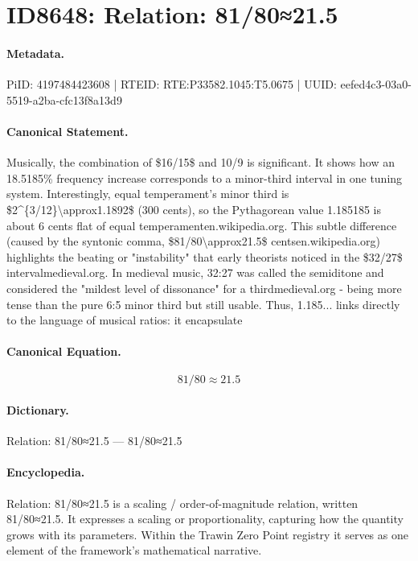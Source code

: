 \section*{ID8648: Relation: 81/80≈21.5}
\paragraph{Metadata.}
PiID: 4197484423608 | RTEID: RTE:P33582.1045:T5.0675 | UUID: eefed4c3-03a0-5519-a2ba-cfc13f8a13d9

\paragraph{Canonical Statement.}
Musically, the combination of \$16/15\$ and 10/9 is significant. It shows how an 18.5185\% frequency increase corresponds to a minor-third interval in one tuning system. Interestingly, equal temperament's minor third is \$2\textasciicircum{}\{3/12\}\textbackslash{}approx1.1892\$ (300 cents), so the Pythagorean value 1.185185 is about 6 cents flat of equal temperamenten.wikipedia.org. This subtle difference (caused by the syntonic comma, \$81/80\textbackslash{}approx21.5\$ centsen.wikipedia.org) highlights the beating or "instability" that early theorists noticed in the \$32/27\$ intervalmedieval.org. In medieval music, 32:27 was called the semiditone and considered the "mildest level of dissonance" for a thirdmedieval.org - being more tense than the pure 6:5 minor third but still usable. Thus, 1.185... links directly to the language of musical ratios: it encapsulate

\paragraph{Canonical Equation.}
\[
81/80\approx21.5
\]

\paragraph{Dictionary.}
Relation: 81/80≈21.5 — 81/80≈21.5

\paragraph{Encyclopedia.}
Relation: 81/80≈21.5 is a scaling / order-of-magnitude relation, written 81/80≈21.5. It expresses a scaling or proportionality, capturing how the quantity grows with its parameters. Within the Trawin Zero Point registry it serves as one element of the framework's mathematical narrative.
